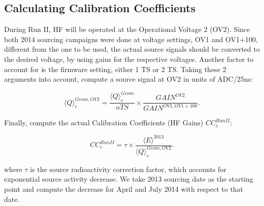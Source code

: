 \subsection{Calculating Calibration Coefficients}
During Run II, HF will be operated at the Operational Voltage 2 (OV2). Since
both 2014 sourcing campaigns were done at voltage settings, OV1 and OV1+100,
different from the one to be used, the actual source signals should be converted to
the desired voltage, by using gains for the respective voltages. Another factor to
account for is the firmware setting, either 1 TS or 2 TS. Taking these 2 arguments
into account, compute a source signal at OV2 in units of ADC/25\unit{ns}:
\begin{center}
	\begin{equation}
		\label{eq:Sig_OV2}
		{\langle{Q}\rangle}^{Geom,OV2}_{c} = \frac{{\langle{Q}\rangle}^{Geom}_{c}}{nTS} \times \frac{{GAIN}^{OV2}}{{GAIN}^{OV1,OV1+100}}.
	\end{equation}
\end{center}
Finally, compute the actual Calibration Coefficients (HF Gains) ${CC}^{Run II}_{c}$:
\begin{center}
	\begin{equation}
		\label{eq:HF_Gains}
		{CC}^{Run II}_{c} = \tau \times \frac{{\langle{E}\rangle}^{2013}}{{\langle{Q}\rangle}^{Geom, OV2}_{c}}.
	\end{equation}
\end{center}
where $\tau$ is the source radioactivity correction factor, which accounts for exponential source activity decrease. We take 2013 sourcing date as the starting point and compute the decrease for April and July 2014 with respect to that date.
